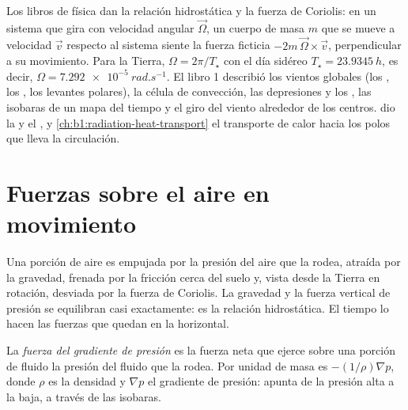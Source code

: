 \begin{recall}
Los libros de física dan la relación hidrostática y la fuerza de Coriolis: en un
sistema que gira con velocidad angular $\vec\Omega$, un cuerpo de masa $m$ que se mueve
a velocidad $\vec v$ respecto al sistema siente la fuerza ficticia
$-2m\,\vec\Omega\times\vec v$, perpendicular a su movimiento. Para la Tierra,
$\Omega = 2\pi/T_\star$ con el día sidéreo $T_\star = \qty{23.9345}{h}$, es decir,
$\Omega = \qty{7.292e-5}{rad.s^{-1}}$. El libro 1 describió los vientos globales (los , los , los levantes polares), la célula de convección, las depresiones y los , las isobaras de un mapa del tiempo y el giro del viento alrededor de los centros.  dio la  y el , y \cref{ch:b1:radiation-heat-transport} el transporte de calor hacia los polos que lleva la circulación.
\end{recall}

\section{Fuerzas sobre el aire en movimiento}\label{sec:b1:atmospheric-circulation:forces}

Una porción de aire es empujada por la presión del aire que la rodea, atraída por la gravedad, frenada por la fricción cerca del suelo y, vista desde la Tierra en rotación, desviada por la fuerza de Coriolis. La gravedad y la fuerza vertical de presión se equilibran casi exactamente: es la relación hidrostática. El tiempo lo hacen las fuerzas que quedan en la horizontal.

\begin{definition}\label{def:b1:atmospheric-circulation:pgf}
La \emph{fuerza del gradiente de presión} es la fuerza neta que ejerce sobre una porción de fluido la presión del fluido que la rodea. Por unidad de masa es $-(1/\rho)\nabla p$, donde $\rho$ es la densidad y $\nabla p$ el gradiente de presión: apunta de la presión alta a la baja, a través de las isobaras.
\end{definition}

